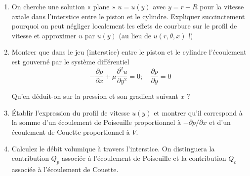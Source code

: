 \begin{enumerate}
\item 
  On cherche une solution « plane » $u=u(y)$  avec $y=r-R$ pour la vitesse axiale dans l’interstice entre le piston et le cylindre.  Expliquer succinctement pourquoi on peut négliger localement les effets de courbure sur le profil de vitesse et approximer $u$ par $u(y)$ (au lieu de $u(r,\theta,x)$ !)

  
\item 
Montrer que dans le jeu (interstice) entre le piston et le cylindre l'écoulement est gouverné par le système différentiel  
$$
-\frac{\partial p}{\partial x} + \mu \frac{\partial^2 u}{\partial y^2} = 0 ;\quad \frac{\partial p}{\partial y}=0
$$



 Qu'en déduit-on sur la pression et son gradient suivant $x$ ?


\item 
Établir l'expression du profil de vitesse $u(y)$ et montrer qu'il correspond à la somme d'un écoulement de Poiseuille proportionnel à $-\partial p/\partial x$ et d'un écoulement de Couette proportionnel à $V$. 



\item Calculez le débit volumique à travers l'interstice. On distinguera la contribution $Q_p$  associée à l'écoulement de Poiseuille et la contribution $Q_c$ associée à l'écoulement de Couette.



\end{enumerate}
